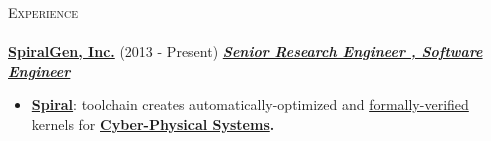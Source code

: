 \documentclass{article}
\newcommand{\lineunder}{\vspace*{-8pt} \\ \hspace*{-18pt} \hrulefill \\}
\newcommand{\header}[1]{{\hspace*{-15pt}\vspace*{6pt} \textsc{#1}} \vspace*{-6pt} \lineunder}
\newcommand{\employer}[3]{{ \textbf{#1} (#2) \underline{\textbf{\emph{#3}}}\\  }}
\begin{document}
\header{\large{Experience}}

\employer{\href{http://spiralgen.com/}{SpiralGen, Inc.}}{2013 - Present}{Senior Research Engineer , Software Engineer}


\vspace{1mm}

    \begin{itemize}
      \item \textbf{\href{http://spiral.net/}{Spiral}}: toolchain creates automatically-optimized  and \href{https://en.wikipedia.org/wiki/Formal_methods}{formally-verified} kernels for \textbf{\href{https://en.wikipedia.org/wiki/Cyber-physical_system}{Cyber-Physical Systems}.} 


\end{itemize}
\end{document}
